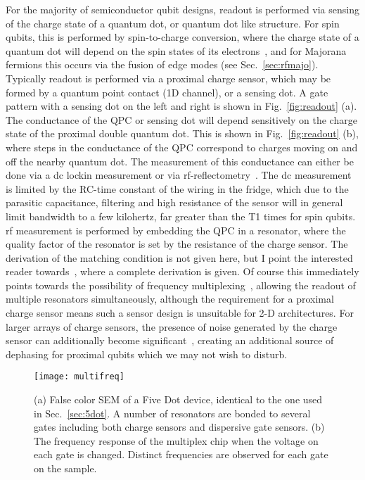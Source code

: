 For the majority of semiconductor qubit designs, readout is performed via sensing of the charge state of a quantum dot, or quantum dot like
structure. For spin qubits, this is performed by spin-to-charge conversion, where the charge state of a quantum dot will depend on the spin states
of its electrons~\cite{nature02693,PhysRevB.98.125404}, and for Majorana fermions this occurs via the fusion of edge modes (see Sec.~\ref{sec:rfmajo}).
Typically readout is performed via a proximal charge sensor, which may be formed by a quantum point contact (1D channel), or a sensing dot. A gate pattern
with a sensing dot on the left and right is shown in Fig.~\ref{fig:readout} (a). The conductance of the QPC or sensing dot will depend sensitively
on the charge state of the proximal double quantum dot. This is shown in Fig.~\ref{fig:readout} (b), where steps in the conductance of the QPC correspond to
charges moving on and off the nearby quantum dot. The measurement of this conductance can either be done via a dc lockin measurement or via
rf-reflectometry~\cite{Reilly:2007ig}. The dc measurement is limited by the RC-time constant of the wiring in the fridge, which due to the parasitic
capacitance, filtering and high resistance of the sensor will in general limit bandwidth to a few kilohertz, far greater than the T1 times for spin qubits.
rf measurement is performed by embedding the QPC in a resonator, where the quality factor of the resonator is set by the resistance of the charge sensor.
The derivation of the matching condition is not given here, but I point the interested reader towards~\cite{crootthesis}, where a complete derivation is given.
Of course this immediately points towards the possibility of frequency multiplexing~\cite{doi:10.1063/1.4868107}, allowing the readout of multiple
resonators simultaneously, although the requirement for a proximal charge sensor means such a sensor design is unsuitable for 2-D architectures. For larger
arrays of charge sensors, the presence of noise generated by the charge sensor can additionally become significant~\cite{PhysRevB.78.035324}, creating
an additional source of dephasing for proximal qubits which we may not wish to disturb.

\begin{figure}
  \texttt{[image: multifreq]}
  \caption[Frequency multiplexed readout of a five-dot device]
  {\label{fig:multifreq}(a) False color SEM of a Five Dot device, identical to the one used in Sec.~\ref{sec:5dot}. A number of resonators are bonded to several gates
  including both charge sensors and dispersive gate sensors. (b) The frequency response of the multiplex chip when the voltage on each gate is changed. Distinct frequencies
  are observed for each gate on the sample.}
\end{figure}


